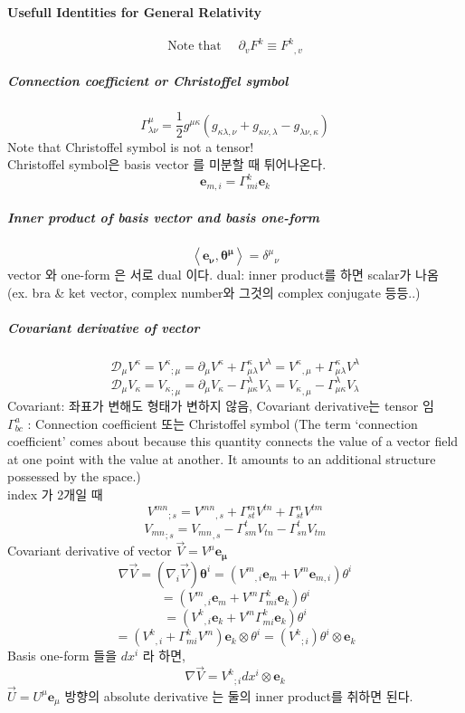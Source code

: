 \documentclass[a4paper,12pt]{report}
\newcommand{\mean}[1]{\left\langle #1 \right\rangle }
\begin{document}
\paragraph{Usefull Identities for General Relativity}
 $$\mbox{Note that }\quad\partial_v F^{k}\equiv{F^k}_{,v}$$
\subparagraph{Connection coefficient or Christoffel symbol}
	$$\Gamma^{\mu}_{\lambda\nu}=\frac{1}{2}g^{\mu\kappa}\left(g_{\kappa\lambda,\nu}+g_{\kappa\nu,\lambda}-g_{\lambda\nu,\kappa} \right) $$
	Note that Christoffel symbol is not a tensor!\\
	Christoffel symbol은 basis vector 를 미분할 때 튀어나온다.
	$$\mathbf{e}_{m,i}=\Gamma^{k}_{mi}\mathbf{e}_k$$
\subparagraph{Inner product of basis vector and basis one-form}
	$$\mean{\mathbf{e_\nu},\mathbf{\theta^\mu}}={\delta^\mu}_\nu$$
	vector 와 one-form 은 서로 dual 이다. dual: inner product를 하면 scalar가 나옴 (ex. bra \& ket vector, complex number와 그것의 complex conjugate 등등..)
\subparagraph{Covariant derivative of vector}
$$\mathcal{D}_\mu V^\kappa = {V^\kappa}_{;\mu}=\partial_\mu V^\kappa +\Gamma^\kappa_{\mu\lambda}V^\lambda={V^\kappa}_{,\mu} +\Gamma^\kappa_{\mu\lambda}V^\lambda$$
$$\mathcal{D}_\mu V_\kappa = {V_\kappa}_{;\mu}=\partial_\mu V_\kappa -\Gamma^\lambda_{\mu\kappa}V_\lambda={V_\kappa}_{,\mu} -\Gamma^\lambda_{\mu\kappa}V_\lambda$$
Covariant: 좌표가 변해도 형태가 변하지 않음, Covariant derivative는 tensor 임\\
$\Gamma^a_{bc}$ : Connection coefficient 또는 Christoffel symbol (The term `connection coefficient' comes about because this quantity connects the value of a vector field at one point with the value at another. It amounts to an additional structure possessed by the space.)\\
index 가 2개일 때
$${V^{mn}}_{;s}={V^{mn}}_{,s}+\Gamma^m_{st}V^{tn}+\Gamma^n_{st}V^{tm}$$
$${V_{mn}}_{;s}={V_{mn}}_{,s}-\Gamma^t_{sm}V_{tn}-\Gamma^t_{sn}V_{tm}$$
Covariant derivative of vector $\vec{V}=V^{\mu}\mathbf{e_\mu}$
$$\nabla \vec{V}=\left(\nabla_i \vec{V} \right)\mathbf{\theta}^i=\left({V^m}_{,i}\mathbf{e}_m+{V^m}\mathbf{e}_{m,i} \right)\theta^i  $$
$$=\left({V^m}_{,i}\mathbf{e}_m+{V^m}\Gamma^{k}_{mi}\mathbf{e}_k \right)\theta^i$$
$$=\left({V^k}_{,i}\mathbf{e}_k+{V^m}\Gamma^{k}_{mi}\mathbf{e}_k \right)\theta^i$$
$$=\left({V^k}_{,i}+\Gamma^{k}_{mi}{V^m} \right)\mathbf{e}_k\otimes\theta^i=\left({V^k}_{;i} \right)\theta^i\otimes\mathbf{e}_k$$
Basis one-form 들을 $dx^i$ 라 하면,
$$\nabla \vec{V}={V^k}_{;i}dx^i\otimes\mathbf{e}_{k}$$
$\vec{U}=U^{\mu}\mathbf{e}_\mu$ 방향의 absolute derivative 는 둘의 inner product를 취하면 된다.
\end{document}
